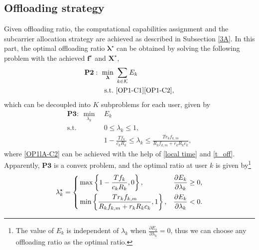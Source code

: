 \documentclass[journal]{IEEEtran}
\begin{document}
    \subsection{Offloading strategy}\label{3B}
    Given offloading ratio, the computational capabilities assignment and the subcarrier allocation strategy are achieved as described in Subsection \ref{3A}. In this part, the optimal offloading ratio $\boldsymbol{\lambda}^\star$ can be obtained by solving the following problem with the achieved $\boldsymbol{f}^\star$ and $\boldsymbol{X}^\star$,
    \begin{equation}
        \label{OP1l}
        \begin{aligned}
            \mathbf{P2}:~\min _{\boldsymbol{\lambda}}~&\sum_{k\in\mathcal{K}}E_{k}\\
            \mathrm{s.t.}  ~&\eqref{OP1-C1}\eqref{OP1-C2},
        \end{aligned}
    \end{equation}
    which can be decoupled into $K$ subproblems for each user, given by
    \begin{subequations}
        \label{OP1lA}
        \begin{align}
            \mathbf{P3}:~\min _{\lambda_{k}}~&E_{k}\\
            \mathrm{s.t.}  ~& 0\leq \lambda_{k}\leq 1,\label{OP1lA-C1}\\
            ~& 1-\frac{Tf_{k}}{c_{k}R_{k}} \leq \lambda_{k} \leq \frac{Tr_{k}f_{k,m}}{R_{k}f_{k,m}+r_{k}R_{k}c_{k}},\label{OP1lA-C2}
        \end{align}
    \end{subequations}
    where \eqref{OP1lA-C2} can be achieved with the help of \eqref{local time} and \eqref{t_off}. Apparently, $\mathbf{P3}$ is a convex problem, and the optimal ratio at user $k$ is given by\footnote{The value of $E_{k}$ is independent of $\lambda_{k}$ when $\frac{\partial E_{k}}{\partial \lambda_{k}}=0$, thus we can choose any offloading ratio as the optimal ratio.}
    \begin{equation}{\label{OP-lkm}}
        \lambda_{k}^\star=
        \left\{
        \begin{aligned}
            &\max\left\{1-\frac{Tf_{k}}{c_{k}R_{k}},0\right\}, &\frac{\partial E_{k}}{\partial \lambda_{k}} \geq 0,\\
            &\min \left\{\frac{Tr_{k}f_{k,m}}{R_{k}f_{k,m}+r_{k}R_{k}c_{k}},1\right\}, &\frac{\partial E_{k}}{\partial \lambda_{k}}< 0.
        \end{aligned}
        \right.
    \end{equation}
\end{document}
